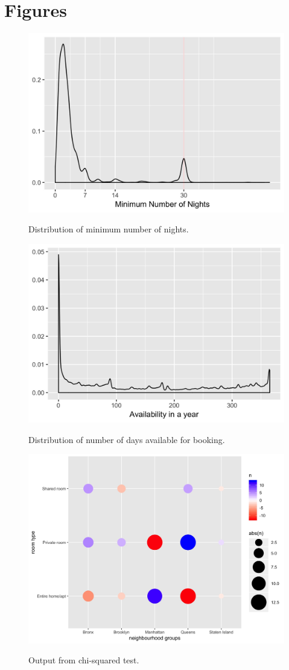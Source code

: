 \documentclass[10pt]{jmlr}%
\begin{document}
\newpage
\appendix

\section{Figures}
\label{appendix:fig}

\begin{figure}[htbp]
	\centering
	\caption{Distribution of minimum number of nights.}
	\includegraphics[width=0.5\linewidth]{length_stay_density.jpeg}
	\label{fig:length_stay_density}
\end{figure}

\begin{figure}[htbp]
	\centering
	\caption{Distribution of number of days available for booking.}
	\includegraphics[width=0.5\linewidth]{availability_density.jpeg}
	\label{fig:availability_density}
\end{figure}

\begin{figure}[htbp]
	\centering
	\caption{Output from chi-squared test.}
	\includegraphics[width=0.5\linewidth]{room_type.jpeg}
	\label{fig:room_type}
\end{figure}
\end{document}
